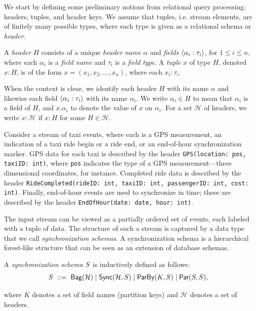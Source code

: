 We start by defining some preliminary notions from relational query processing: headers, tuples, and header keys. We assume that tuples, i.e. stream elements, are of finitely many possible types, where each type is given as a relational schema or \emph{header}.

\begin{definition}
A \emph{header} $H$
consists of a unique \emph{header name} \(\alpha\)
and \emph{fields} \(\hdrfield{\alpha_i}{\tau_i}\), for $1\le i\le n$,
where each \(\alpha_i\) is a \emph{field name}
and \(\tau_i\) is a \emph{field type}.
A \emph{tuple} $x$ of type \(H\), denoted $x : H$, is of the form
\(x = (x_1, x_2, \ldots, x_n)\), where each \(x_i : \tau_i\).
\end{definition}

When the context is clear, we identify each header \(H\) with its name \(\alpha\)
and likewise each field \(\hdrfield{\alpha_i}{\tau_i}\) with its name \(\alpha_i\).
We write \(\alpha_i \in H\) to mean that \(\alpha_i\) is a field of \(H\), and
\(x.\alpha_i\) to denote the value of \(x\) on \(\alpha_i\).
For a set $\mathcal{H}$ of headers, we write
$x: \mathcal{H}$ if $x : H$ for some $H \in \mathcal{H}$.

\begin{example}
\label{ex:taxi-distance-schema-headers}
Consider a stream of taxi events, where each is a GPS measurement, an indication of a taxi ride begin or a ride end, or an end-of-hour synchronization marker.
GPS data for each taxi is described by the header \texttt{GPS(location: pos, taxiID: int)}, where \texttt{pos} indicates the type of a GPS measurement---three dimensional coordinates, for instance.
Completed ride data is described by the header \texttt{RideCompleted(rideID: int, taxiID: int, passengerID: int, cost: int)}.
Finally, end-of-hour events are used to synchronize in time; these are described by the header \texttt{EndOfHour(date: date, hour: int)}.
\end{example}

The input stream
can be viewed as a partially ordered set of events, each labeled with a tuple of data.
The structure of such a stream is captured by a data type that we call \emph{synchronization schemas}. A synchronization schema is a hierarchical forest-like structure that can be seen as an extension of database schemas.

\begin{definition}
\label{def:sync-schema}
A \emph{synchronization schema} $\ss$ is inductively defined as follows:
\[    S \ ::=\   \relleaf{\mathcal{H}} \mid
             \hier{\mathcal{H}}{S} \mid
            \keyby{K}{S} \mid
             \parcomp{S}{S},
\]

where $K$ denotes a set of field names (partition keys) and $\mathcal{H}$ denotes a set of headers.
\end{definition}

